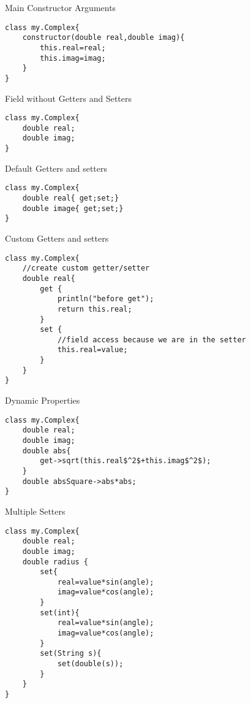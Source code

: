 \documentclass{tufte-book}
\begin{document}
            Main Constructor Arguments
\lstset{mathescape=true}
            \begin{lstlisting}
class my.Complex{
    constructor(double real,double imag){
        this.real=real;
        this.imag=imag;
    }
}
            \end{lstlisting}
\lstset{mathescape=false}

            Field without Getters and Setters
\lstset{mathescape=true}
            \begin{lstlisting}
class my.Complex{
    double real;
    double imag;
}
            \end{lstlisting}
\lstset{mathescape=false}

            
            Default Getters and setters
\lstset{mathescape=true}
            \begin{lstlisting}
class my.Complex{
    double real{ get;set;}
    double image{ get;set;}
}
            \end{lstlisting}
\lstset{mathescape=false}

            
            Custom Getters and setters
\lstset{mathescape=true}
            \begin{lstlisting}
class my.Complex{
    //create custom getter/setter
    double real{
        get {
            println("before get");
            return this.real;
        }
        set {
            //field access because we are in the setter
            this.real=value;
        }
    }
}
            \end{lstlisting}
\lstset{mathescape=false}


            Dynamic Properties
\lstset{mathescape=true}
            \begin{lstlisting}
class my.Complex{
    double real;
    double imag;
    double abs{
        get->sqrt(this.real$^2$+this.imag$^2$);
    }
    double absSquare->abs*abs;
}
            \end{lstlisting}
\lstset{mathescape=false}

            
            Multiple Setters

\lstset{mathescape=true}
            \begin{lstlisting}
class my.Complex{
    double real;
    double imag;
    double radius {
        set{
            real=value*sin(angle);
            imag=value*cos(angle);
        }
        set(int){
            real=value*sin(angle);
            imag=value*cos(angle);
        }
        set(String s){
            set(double(s));
        }
    }
}
            \end{lstlisting}
\lstset{mathescape=false}
\end{document}
